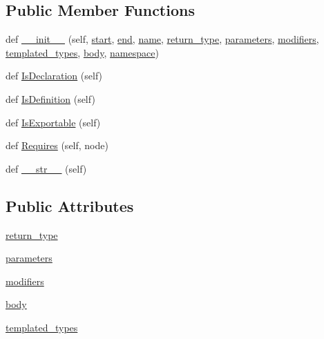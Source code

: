 \subsection*{Public Member Functions}
\begin{DoxyCompactItemize}
\item 
def \hyperlink{classcpp_1_1ast_1_1Function_ab5270f5d353ec5e9dcd136e4cc6c7f6c}{\+\_\+\+\_\+init\+\_\+\+\_\+} (self, \hyperlink{classcpp_1_1ast_1_1Node_a7b2aa97e6a049bb1a93aea48c48f1f44}{start}, \hyperlink{classcpp_1_1ast_1_1Node_a3c5e5246ccf619df28eca02e29d69647}{end}, \hyperlink{classcpp_1_1ast_1_1__GenericDeclaration_af774f4729dfd78d0538a6782fe8514c1}{name}, \hyperlink{classcpp_1_1ast_1_1Function_af750fd788d7ab33163ee066534780212}{return\+\_\+type}, \hyperlink{classcpp_1_1ast_1_1Function_a0e61ef47af9cf2fd4402dbd8cab631ef}{parameters}, \hyperlink{classcpp_1_1ast_1_1Function_ad30eed435f1ff9ff34ade9cc0d7be121}{modifiers}, \hyperlink{classcpp_1_1ast_1_1Function_a57bb03218bade3240137a0d91c467cb6}{templated\+\_\+types}, \hyperlink{classcpp_1_1ast_1_1Function_a8e25e5016b23b38e32acf2df529c0650}{body}, \hyperlink{classcpp_1_1ast_1_1__GenericDeclaration_a8aee3f11b37449d54b42a78e0a689f46}{namespace})
\item 
def \hyperlink{classcpp_1_1ast_1_1Function_ab9120d9a774eb5860d220b3bcdcaa87e}{Is\+Declaration} (self)
\item 
def \hyperlink{classcpp_1_1ast_1_1Function_ad5d96144bd8418ac72332bffb21ea86f}{Is\+Definition} (self)
\item 
def \hyperlink{classcpp_1_1ast_1_1Function_a85a073cd69116bc6191f379d69d10d72}{Is\+Exportable} (self)
\item 
def \hyperlink{classcpp_1_1ast_1_1Function_a999e7b5e43517cd4d68b1aeea8a7d6e1}{Requires} (self, node)
\item 
def \hyperlink{classcpp_1_1ast_1_1Function_aaef91d6a3b1eb2703eebb32d39c45978}{\+\_\+\+\_\+str\+\_\+\+\_\+} (self)
\end{DoxyCompactItemize}
\subsection*{Public Attributes}
\begin{DoxyCompactItemize}
\item 
\hyperlink{classcpp_1_1ast_1_1Function_af750fd788d7ab33163ee066534780212}{return\+\_\+type}
\item 
\hyperlink{classcpp_1_1ast_1_1Function_a0e61ef47af9cf2fd4402dbd8cab631ef}{parameters}
\item 
\hyperlink{classcpp_1_1ast_1_1Function_ad30eed435f1ff9ff34ade9cc0d7be121}{modifiers}
\item 
\hyperlink{classcpp_1_1ast_1_1Function_a8e25e5016b23b38e32acf2df529c0650}{body}
\item 
\hyperlink{classcpp_1_1ast_1_1Function_a57bb03218bade3240137a0d91c467cb6}{templated\+\_\+types}
\end{DoxyCompactItemize}


